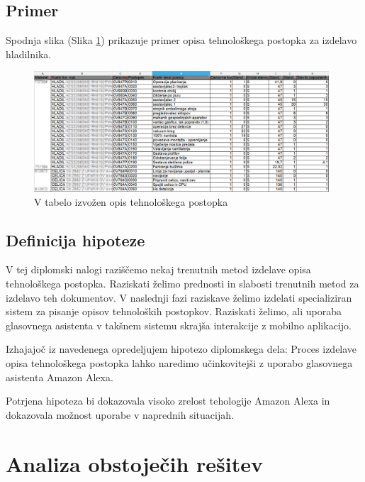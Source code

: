 \documentclass[a4paper, 12pt]{book}
\begin{document}
\subsection{Primer}
Spodnja slika (Slika \ref{sap_2}) prikazuje primer opisa tehnološkega postopka za izdelavo hladilnika.

\begin{figure}[H]
\begin{center}
\includegraphics[width=11cm]{sap_2}
\end{center}
\caption{V tabelo izvožen opis tehnološkega postopka}
\label{sap_2}
\end{figure}



\subsection{Definicija hipoteze}

V tej diplomski nalogi raziščemo nekaj trenutnih metod izdelave opisa tehnološkega postopka.
Raziskati želimo prednosti in slabosti trenutnih metod za izdelavo teh dokumentov.
V naslednji fazi raziskave želimo izdelati specializiran sistem za pisanje opisov tehnoloških postopkov.
Raziskati želimo, ali uporaba glasovnega asistenta v takšnem sistemu skrajša interakcije z mobilno aplikacijo.

Izhajajoč iz navedenega opredeljujem hipotezo diplomskega dela: Proces izdelave opisa tehnološkega postopka lahko naredimo učinkovitejši z uporabo glasovnega asistenta Amazon Alexa.

Potrjena hipoteza bi dokazovala visoko zrelost tehologije Amazon Alexa in dokazovala možnost uporabe v naprednih situacijah.

\section{Analiza obstoječih rešitev}
\end{document}
